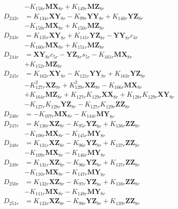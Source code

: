 \begin{multicols}{2}
\begin{align}
&- K_{158r}\mathbf{MX}_{8r} + K_{149r}\mathbf{MZ}_{8r} \nonumber \\
D_{242r} &= K_{134r}\mathbf{XY}_{8r} - K_{99r}\mathbf{YY}_{8r} + K_{140r}\mathbf{YZ}_{8r}  \nonumber \\
&- K_{159r}\mathbf{MX}_{8r} + K_{150r}\mathbf{MZ}_{8r} \nonumber \\
D_{243r} &= K_{135r}\mathbf{XY}_{8r} + K_{141r}\mathbf{YZ}_{8r} - \mathbf{YY}_{8r}c_{4r}  \nonumber \\
&- K_{160r}\mathbf{MX}_{8r} + K_{151r}\mathbf{MZ}_{8r} \nonumber \\
D_{244r} &= \mathbf{XY}_{8r}c_{5r} - \mathbf{YZ}_{8r}s_{5r} - K_{161r}\mathbf{MX}_{8r}  \nonumber \\
&+ K_{152r}\mathbf{MZ}_{8r} \nonumber \\
D_{245r} &= K_{162r}\mathbf{XY}_{8r} - K_{121r}\mathbf{YY}_{8r} + K_{163r}\mathbf{YZ}_{8r}  \nonumber \\
&- K_{127r}^2\mathbf{XZ}_{8r} + K_{129r}^2\mathbf{XZ}_{8r} - K_{166r}\mathbf{MX}_{8r}  \nonumber \\
&+ K_{164r}\mathbf{MZ}_{8r} + K_{127r}K_{129r}\mathbf{XX}_{8r} + K_{128r}K_{129r}\mathbf{XY}_{8r}  \nonumber \\
&- K_{127r}K_{128r}\mathbf{YZ}_{8r} - K_{127r}K_{129r}\mathbf{ZZ}_{8r} \nonumber \\
D_{246r} &= - K_{107r}\mathbf{MX}_{8r} - K_{144r}\mathbf{MY}_{8r} \nonumber \\
D_{247r} &= K_{130r}\mathbf{XZ}_{8r} - K_{95r}\mathbf{YZ}_{8r} + K_{136r}\mathbf{ZZ}_{8r}  \nonumber \\
&- K_{108r}\mathbf{MX}_{8r} - K_{145r}\mathbf{MY}_{8r} \nonumber \\
D_{248r} &= K_{131r}\mathbf{XZ}_{8r} - K_{96r}\mathbf{YZ}_{8r} + K_{137r}\mathbf{ZZ}_{8r}  \nonumber \\
&- K_{109r}\mathbf{MX}_{8r} - K_{146r}\mathbf{MY}_{8r} \nonumber \\
D_{249r} &= K_{131r}\mathbf{XZ}_{8r} - K_{96r}\mathbf{YZ}_{8r} + K_{137r}\mathbf{ZZ}_{8r}  \nonumber \\
&- K_{110r}\mathbf{MX}_{8r} - K_{147r}\mathbf{MY}_{8r} \nonumber \\
D_{250r} &= K_{132r}\mathbf{XZ}_{8r} - K_{97r}\mathbf{YZ}_{8r} + K_{138r}\mathbf{ZZ}_{8r}  \nonumber \\
&- K_{111r}\mathbf{MX}_{8r} - K_{148r}\mathbf{MY}_{8r} \nonumber \\
D_{251r} &= K_{133r}\mathbf{XZ}_{8r} - K_{98r}\mathbf{YZ}_{8r} + K_{139r}\mathbf{ZZ}_{8r}  \nonumber \\

\end{align}
\end{multicols}
